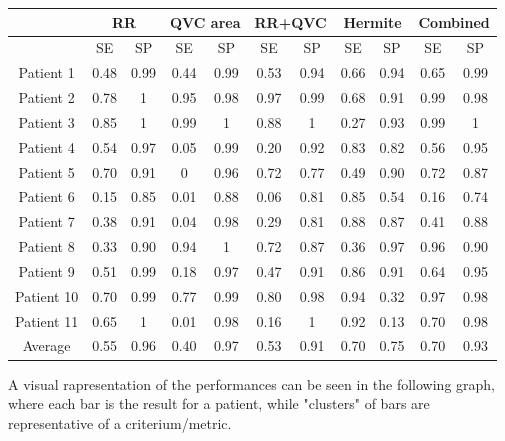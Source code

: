 \documentclass[a4paper,titlepage]{article}
\begin{document}
\providecommand{\tabularnewline}{\\}

\makeatother
\begin{tabular}{|c|c|c|c|c|c|c|c|c|c|c|}
\hline
 & \multicolumn{2}{c|}{RR} & \multicolumn{2}{c|}{QVC area} & \multicolumn{2}{c|}{RR+QVC} & \multicolumn{2}{c|}{Hermite} & \multicolumn{2}{c|}{Combined}\tabularnewline
\hline
 & SE & SP & SE & SP & SE & SP & SE & SP & SE & SP\tabularnewline
\hline
Patient 1 & 0.48 & 0.99 & 0.44 & 0.99 & 0.53 & 0.94 & 0.66 & 0.94 & 0.65 & 0.99\tabularnewline
\hline
Patient 2 & 0.78 & 1 & 0.95 & 0.98 & 0.97 & 0.99 & 0.68 & 0.91 & 0.99 & 0.98\tabularnewline
\hline
Patient 3 & 0.85 & 1 & 0.99 & 1 & 0.88 & 1 & 0.27 & 0.93 & 0.99 & 1\tabularnewline
\hline
Patient 4 & 0.54 & 0.97 & 0.05 & 0.99 & 0.20 & 0.92 & 0.83 & 0.82 & 0.56 & 0.95\tabularnewline
\hline
Patient 5 & 0.70 & 0.91 & 0 & 0.96 & 0.72 & 0.77 & 0.49 & 0.90 & 0.72 & 0.87\tabularnewline
\hline
Patient 6 & 0.15 & 0.85 & 0.01 & 0.88 & 0.06 & 0.81 & 0.85 & 0.54 & 0.16 & 0.74\tabularnewline
\hline
Patient 7 & 0.38 & 0.91 & 0.04 & 0.98 & 0.29 & 0.81 & 0.88 & 0.87 & 0.41 & 0.88\tabularnewline
\hline
Patient 8 & 0.33 & 0.90 & 0.94 & 1 & 0.72 & 0.87 & 0.36 & 0.97 & 0.96 & 0.90\tabularnewline
\hline
Patient 9 & 0.51 & 0.99 & 0.18 & 0.97 & 0.47 & 0.91 & 0.86 & 0.91 & 0.64 & 0.95\tabularnewline
\hline
Patient 10 & 0.70 & 0.99 & 0.77 & 0.99 & 0.80 & 0.98 & 0.94 & 0.32 & 0.97 & 0.98\tabularnewline
\hline
Patient 11 & 0.65 & 1 & 0.01 & 0.98 & 0.16 & 1 & 0.92 & 0.13 & 0.70 & 0.98\tabularnewline
\hline
Average & 0.55 & 0.96 & 0.40 & 0.97 & 0.53 & 0.91 & 0.70 & 0.75 & 0.70 & 0.93\tabularnewline
\hline
\end{tabular}

\hfill \break
A visual rapresentation of the performances can be seen in the following graph, where each bar is the result for a patient, while "clusters" of bars are representative of a criterium/metric.
\end{document}
